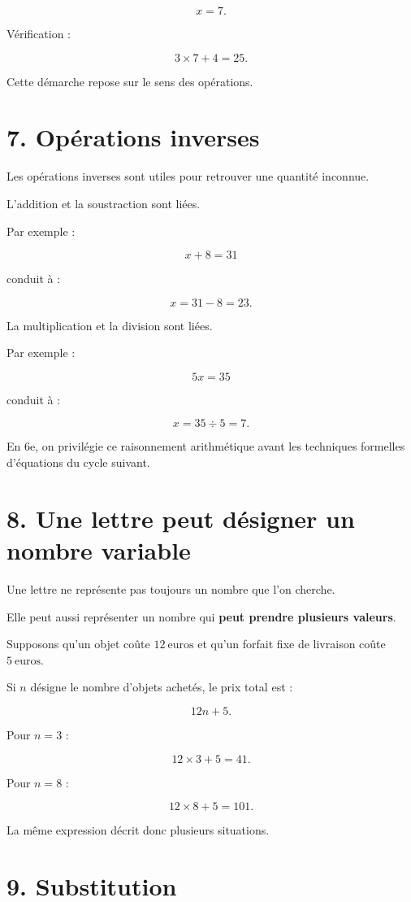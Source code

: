 \[
\boxed{x=7}.
\]

Vérification :

\[
3\times7+4=25.
\]

Cette démarche repose sur le sens des opérations.

\section{7. Opérations inverses}

Les opérations inverses sont utiles pour retrouver une quantité inconnue.

L’addition et la soustraction sont liées.

Par exemple :

\[
x+8=31
\]

conduit à :

\[
x=31-8=23.
\]

La multiplication et la division sont liées.

Par exemple :

\[
5x=35
\]

conduit à :

\[
x=35\div5=7.
\]

En 6e, on privilégie ce raisonnement arithmétique avant les techniques formelles d’équations du cycle suivant.

\section{8. Une lettre peut désigner un nombre variable}

Une lettre ne représente pas toujours un nombre que l’on cherche.

Elle peut aussi représenter un nombre qui \textbf{peut prendre plusieurs valeurs}.

Supposons qu’un objet coûte $12\ \text{euros}$ et qu’un forfait fixe de livraison coûte $5\ \text{euros}$.

Si $n$ désigne le nombre d’objets achetés, le prix total est :

\[
12n+5.
\]

Pour $n=3$ :

\[
12\times3+5=41.
\]

Pour $n=8$ :

\[
12\times8+5=101.
\]

La même expression décrit donc plusieurs situations.

\section{9. Substitution}

